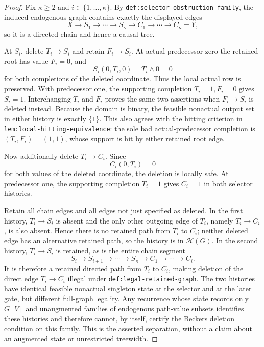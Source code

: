\documentclass{article}
\begin{document}
\begin{proof}
Fix \(\kappa\ge2\) and \(i\in\{1,\ldots,\kappa\}\).  By \texttt{def:selector-obstruction-family}, the induced endogenous graph contains exactly the displayed edges
\[
 X\to S_1\to\cdots\to S_\kappa\to C_1\to\cdots\to C_\kappa=Y,
\]
so it is a directed chain and hence a causal tree.

At \(S_i\), delete \(T_i\to S_i\) and retain \(F_i\to S_i\).  At actual predecessor zero the retained root has value \(F_i=0\), and
\[
 S_i(0,T_i,0)=T_i\wedge0=0
\]
for both completions of the deleted coordinate.  Thus the local actual row is preserved.  With predecessor one, the supporting completion \(T_i=1,F_i=0\) gives \(S_i=1\).  Interchanging \(T_i\) and \(F_i\) proves the same two assertions when \(F_i\to S_i\) is deleted instead.  Because the domain is binary, the feasible nonactual output set in either history is exactly \(\{1\}\).  This also agrees with the hitting criterion in \texttt{lem:local-hitting-equivalence}: the sole bad actual-predecessor completion is \((T_i,F_i)=(1,1)\), whose support is hit by either retained root edge.

Now additionally delete \(T_i\to C_i\).  Since
\[
 C_i(0,T_i)=0
\]
for both values of the deleted coordinate, the deletion is locally safe.  At predecessor one, the supporting completion \(T_i=1\) gives \(C_i=1\) in both selector histories.

Retain all chain edges and all edges not just specified as deleted.  In the first history, \(T_i\to S_i\) is absent and the only other outgoing edge of \(T_i\), namely \(T_i\to C_i\), is also absent.  Hence there is no retained path from \(T_i\) to \(C_i\); neither deleted edge has an alternative retained path, so the history is in \(\mathcal H(G)\).  In the second history, \(T_i\to S_i\) is retained, as is the entire chain segment
\[
 S_i\to S_{i+1}\to\cdots\to S_\kappa\to C_1\to\cdots\to C_i.
\]
It is therefore a retained directed path from \(T_i\) to \(C_i\), making deletion of the direct edge \(T_i\to C_i\) illegal under \texttt{def:legal-retained-graph}.  The two histories have identical feasible nonactual singleton state at the selector and at the later gate, but different full-graph legality.  Any recurrence whose state records only \(G[V]\) and unaugmented families of endogenous path-value subsets identifies these histories and therefore cannot, by itself, certify the Beckers deletion condition on this family.  This is the asserted separation, without a claim about an augmented state or unrestricted treewidth.
\end{proof}
\end{document}
